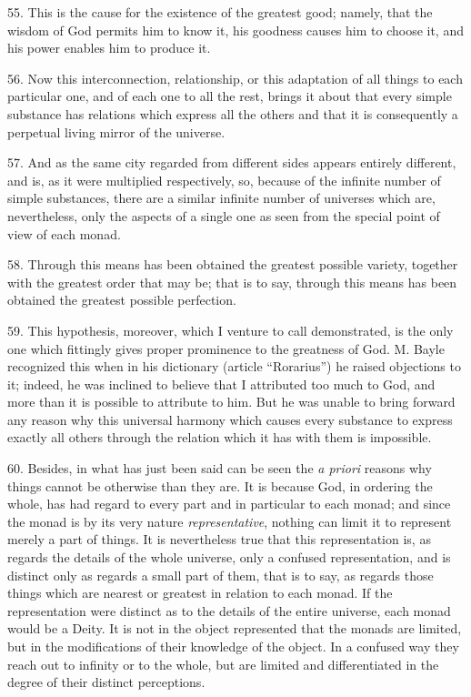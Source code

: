 55. This is the cause for the existence of the greatest good; namely,
that the wisdom of God permits him to know it, his goodness causes him
to choose it, and his power enables him to produce it.

56. Now this interconnection, relationship, or this adaptation of all
things to each particular one, and  of each one to all the
rest, brings it about that every simple substance has relations which
express all the others and that it is consequently a perpetual living
mirror of the universe.


57. And as the same city regarded from different sides appears
entirely different, and is, as it were multiplied respectively, so,
because of the infinite number of simple substances, there are a
similar infinite number of universes which are, nevertheless, only the
aspects of a single one as seen from the special point of view of each
monad.

58. Through this means has been obtained the greatest possible
variety, together with the greatest order that may be; that is to say,
through this means has been obtained the greatest possible
perfection.

59. This hypothesis, moreover, which I venture to call demonstrated,
is the only one which fittingly gives proper prominence to the
greatness of God. M. Bayle recognized this when in his dictionary
(article ``Rorarius'') he raised objections to it; indeed, he was
inclined to believe that I attributed too much to God, and more than
it is possible to attribute to him. But he was unable to bring forward
any reason why this universal harmony which causes every substance to
express exactly all others through the relation which it has with them
is impossible.

60. Besides, in what has just been said can be seen the \textit{a
priori} reasons why things cannot be otherwise than they are. It is
because God, in ordering the whole, has had regard to every part and
in particular to each monad; and since the monad is by its very nature
\textit{representative}, nothing can limit it to represent merely a
part of things. It is nevertheless true that this representation is,
as regards the details of the  whole universe, only a
confused representation, and is distinct only as regards a small part
of them, that is to say, as regards those things which are nearest or
greatest in relation to each monad. If the representation were
distinct as to the details of the entire universe, each monad would be
a Deity. It is not in the object represented that the monads are
limited, but in the modifications of their knowledge of the object. In
a confused way they reach out to infinity or to the whole, but are
limited and differentiated in the degree of their distinct
perceptions.

